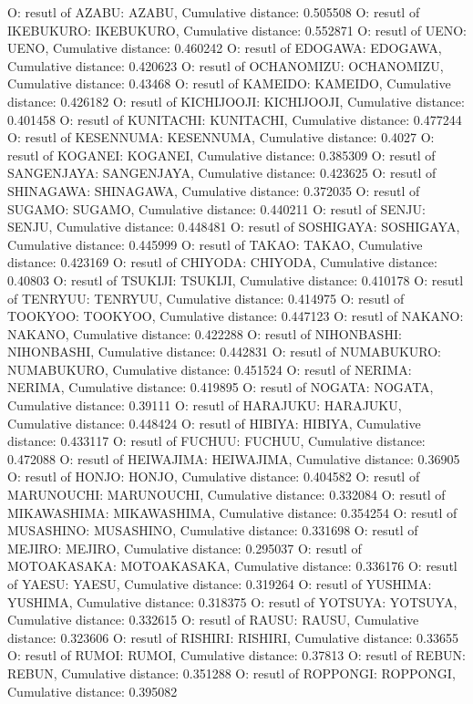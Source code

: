 O: resutl of AZABU: AZABU, Cumulative distance: 0.505508
O: resutl of IKEBUKURO: IKEBUKURO, Cumulative distance: 0.552871
O: resutl of UENO: UENO, Cumulative distance: 0.460242
O: resutl of EDOGAWA: EDOGAWA, Cumulative distance: 0.420623
O: resutl of OCHANOMIZU: OCHANOMIZU, Cumulative distance: 0.43468
O: resutl of KAMEIDO: KAMEIDO, Cumulative distance: 0.426182
O: resutl of KICHIJOOJI: KICHIJOOJI, Cumulative distance: 0.401458
O: resutl of KUNITACHI: KUNITACHI, Cumulative distance: 0.477244
O: resutl of KESENNUMA: KESENNUMA, Cumulative distance: 0.4027
O: resutl of KOGANEI: KOGANEI, Cumulative distance: 0.385309
O: resutl of SANGENJAYA: SANGENJAYA, Cumulative distance: 0.423625
O: resutl of SHINAGAWA: SHINAGAWA, Cumulative distance: 0.372035
O: resutl of SUGAMO: SUGAMO, Cumulative distance: 0.440211
O: resutl of SENJU: SENJU, Cumulative distance: 0.448481
O: resutl of SOSHIGAYA: SOSHIGAYA, Cumulative distance: 0.445999
O: resutl of TAKAO: TAKAO, Cumulative distance: 0.423169
O: resutl of CHIYODA: CHIYODA, Cumulative distance: 0.40803
O: resutl of TSUKIJI: TSUKIJI, Cumulative distance: 0.410178
O: resutl of TENRYUU: TENRYUU, Cumulative distance: 0.414975
O: resutl of TOOKYOO: TOOKYOO, Cumulative distance: 0.447123
O: resutl of NAKANO: NAKANO, Cumulative distance: 0.422288
O: resutl of NIHONBASHI: NIHONBASHI, Cumulative distance: 0.442831
O: resutl of NUMABUKURO: NUMABUKURO, Cumulative distance: 0.451524
O: resutl of NERIMA: NERIMA, Cumulative distance: 0.419895
O: resutl of NOGATA: NOGATA, Cumulative distance: 0.39111
O: resutl of HARAJUKU: HARAJUKU, Cumulative distance: 0.448424
O: resutl of HIBIYA: HIBIYA, Cumulative distance: 0.433117
O: resutl of FUCHUU: FUCHUU, Cumulative distance: 0.472088
O: resutl of HEIWAJIMA: HEIWAJIMA, Cumulative distance: 0.36905
O: resutl of HONJO: HONJO, Cumulative distance: 0.404582
O: resutl of MARUNOUCHI: MARUNOUCHI, Cumulative distance: 0.332084
O: resutl of MIKAWASHIMA: MIKAWASHIMA, Cumulative distance: 0.354254
O: resutl of MUSASHINO: MUSASHINO, Cumulative distance: 0.331698
O: resutl of MEJIRO: MEJIRO, Cumulative distance: 0.295037
O: resutl of MOTOAKASAKA: MOTOAKASAKA, Cumulative distance: 0.336176
O: resutl of YAESU: YAESU, Cumulative distance: 0.319264
O: resutl of YUSHIMA: YUSHIMA, Cumulative distance: 0.318375
O: resutl of YOTSUYA: YOTSUYA, Cumulative distance: 0.332615
O: resutl of RAUSU: RAUSU, Cumulative distance: 0.323606
O: resutl of RISHIRI: RISHIRI, Cumulative distance: 0.33655
O: resutl of RUMOI: RUMOI, Cumulative distance: 0.37813
O: resutl of REBUN: REBUN, Cumulative distance: 0.351288
O: resutl of ROPPONGI: ROPPONGI, Cumulative distance: 0.395082

